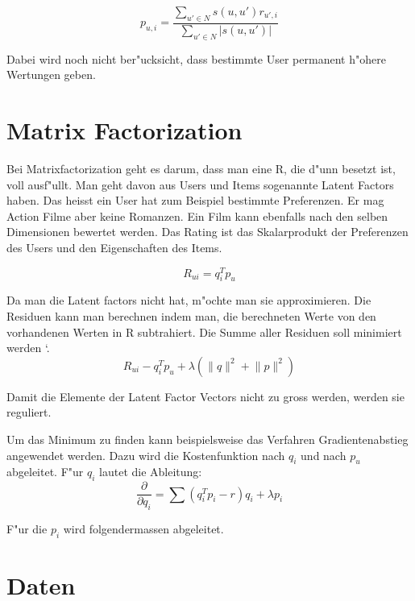 \documentclass[a4paper, 11pt]{article}
\begin{document}
\begin{equation}
  \label{eq:computeprediction}
  p_{u,i} = \frac{\sum_{u' \in N}{s(u,u') r_{u',i}}}{\sum_{u' \in N}{|s(u,u')|}}
\end{equation}

Dabei wird noch nicht ber"ucksicht, dass bestimmte User permanent h"ohere Wertungen geben.

\section{Matrix Factorization}
\label{sec:matrixfactorization}

Bei Matrixfactorization geht es darum, dass man eine R, die d"unn besetzt ist, voll ausf"ullt. Man geht davon aus Users und Items sogenannte Latent Factors haben. Das heisst ein User hat zum Beispiel bestimmte Preferenzen. Er mag Action Filme aber keine Romanzen. Ein Film kann ebenfalls nach den selben Dimensionen bewertet werden. Das Rating ist das Skalarprodukt der Preferenzen des Users und den Eigenschaften des Items.

\begin{equation}
  \label{eq:latentfactors}
  R_{ui} = q_i^T p_u
\end{equation}

Da man die Latent factors nicht hat, m"ochte man sie approximieren. Die Residuen kann man berechnen indem man, die berechneten Werte von den vorhandenen Werten in R subtrahiert. Die Summe aller Residuen soll minimiert werden \cite{koren2009}`.
\begin{equation}
  \label{eq:optimization}
    R_{ui} - q_i^T p_u + \lambda (\lVert q \rVert^2 + \lVert p \lVert ^2)
\end{equation}

Damit die Elemente der Latent Factor Vectors nicht zu gross werden, werden sie reguliert.
 
Um das Minimum zu finden kann beispielsweise das Verfahren Gradientenabstieg angewendet werden. Dazu wird die Kostenfunktion nach $q_i$ und nach $p_u$ abgeleitet. F"ur $q_i$ lautet die Ableitung:
\begin{equation}
  \label{eq:decx}
  \frac{ \partial }{ \partial q_i } = \sum (q_i^T p_i - r) q_i + \lambda p_i
\end{equation}

F"ur die $p_i$ wird folgendermassen abgeleitet.

\section{Daten}
\label{sec:data}
\end{document}
